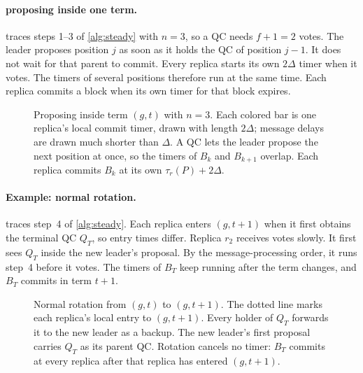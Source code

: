 \documentclass[11pt,a4paper]{article}
\begin{document}
\paragraph{proposing inside one term.}
 traces steps 1--3 of \cref{alg:steady} with $n=3$, so a
QC needs $f+1=2$ votes. The leader proposes position $j$ as soon as it
holds the QC of position $j-1$. It does not wait for that parent to commit.
Every replica starts its own $2\Delta$ timer when it votes. The timers of
several positions therefore run at the same time. Each replica commits a
block when its own timer for that block expires.

\begin{figure}[htbp]\centering

\caption{Proposing inside term $(g,t)$ with $n=3$. Each colored bar is one
replica's local commit timer, drawn with length $2\Delta$; message delays
are drawn much shorter than $\Delta$. A QC lets the leader propose the next
position at once, so the timers of $B_k$ and $B_{k+1}$ overlap. Each
replica commits $B_k$ at its own $\tau_r(P)+2\Delta$.}
\label{fig:steady}
\end{figure}



\paragraph{Example: normal rotation.}
 traces step~4 of \cref{alg:steady}. Each replica enters
$(g,t+1)$ when it first obtains the terminal QC $Q_T$, so entry times
differ. Replica $r_2$ receives votes slowly. It first sees $Q_T$ inside
the new leader's proposal. By the message-processing order, it runs
step~4 before it votes. The timers of $B_T$ keep running after the term
changes, and $B_T$ commits in term $t+1$.

\begin{figure}[htbp]\centering

\caption{Normal rotation from $(g,t)$ to $(g,t+1)$. The dotted line marks
each replica's local entry to $(g,t+1)$. Every holder of $Q_T$ forwards it
to the new leader as a backup. The new leader's first proposal carries
$Q_T$ as its parent QC. Rotation cancels no timer: $B_T$ commits at every
replica after that replica has entered $(g,t+1)$.}
\label{fig:rotation}
\end{figure}
\end{document}

